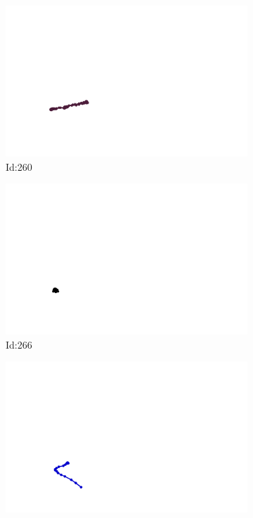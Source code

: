 \documentclass[12pt,twoside]{report}
\begin{document}
\begin{figure}
\centering
\begin{subfigure}[b]{0.20\textwidth}
\centering
\includegraphics[width=\textwidth]{../trajectories/260.png}
\caption{Id:260}
\end{subfigure}
\begin{subfigure}[b]{0.20\textwidth}
\centering
\includegraphics[width=\textwidth]{../trajectories/266.png}
\caption{Id:266}
\end{subfigure}
\begin{subfigure}[b]{0.20\textwidth}
\centering
\includegraphics[width=\textwidth]{../trajectories/270.png}

\end{subfigure}
\end{figure}
\end{document}

